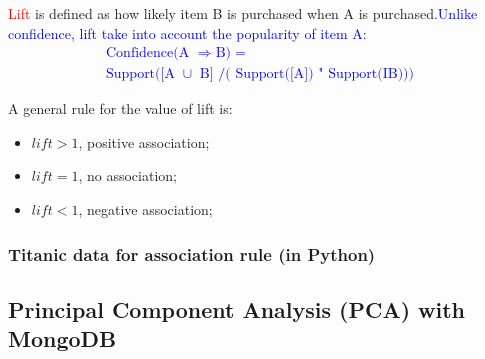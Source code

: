 \documentclass[12pt]{article}
\newcommand{\redp}[1]{\textcolor{red}{#1}}
\newcommand{\bluep}[1]{\textcolor{blue}{#1}}
\begin{document}
\begin{code}
\redp{Lift} is defined as how likely item B is purchased when A is purchased.\bluep{Unlike confidence, lift take into account the popularity of item A:
$$
\begin{array}{l}{ \text { Confidence(A }\Rightarrow \mathrm{B})=} \\ {\text { Support([A } \cup \text { B] } /( \text { Support([A]) " Support(IB))) } }\end{array}
$$
}

A general rule for the value of lift is:
\begin{itemize}
    \item $lift>1$, positive association; 
    \item $lift=1$, no association;
    \item $lift<1$, negative association;
\end{itemize}
\subsubsection{Titanic data for association rule (in Python)}

\subsection{Principal Component Analysis (PCA) with MongoDB}
\begin{figure}[H]


\begin{tikzpicture}[x=0.75pt,y=0.75pt,yscale=-1,xscale=1]


\end{tikzpicture}
\end{figure}
\end{code}
\end{document}
